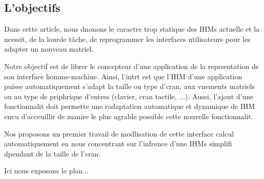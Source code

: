 \documentclass[fleqn]{article-hermes}
\begin{document}
\subsection{L'objectifs}
Dans cette article, nous dnonons le caractre trop statique des IHMs
actuelle et la ncessit, de la lourde t\^{a}che, de reprogrammer les
interfaces utilisateurs pour les adapter  un nouveau matriel.

Notre objectif est de librer le concepteur d'une application de la
reprsentation de son interface homme-machine.
Ainsi, l'intrt est que l'IHM d'une application puisse
automatiquement s'adapt  la taille ou type d'cran, aux vnements
matriels ou au type de priphrique d'entres (clavier, cran
tactile, ...). 
Aussi, l'ajout d'une fonctionnalit doit permette une radaptation
automatique et dynamique de IHM envu d'acceuillir de manire le plus
agrable possible cette nouvelle fonctionnalit.

Nos proposons un premier travail de modlisation de cette interface
calcul automatiquement en nous concentrant sur l'infrence d'une IHMs
simplifi dpendant de la taille de l'cran.

Ici nous exposons le plan...
\end{document}
